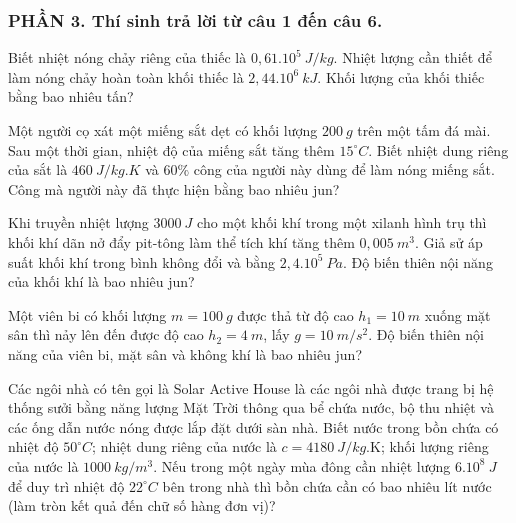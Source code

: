 \subsubsection*{PHẦN 3. Thí sinh trả lời từ câu 1 đến câu 6.}
\setcounter{ex}{0}
\begin{ex}
Biết nhiệt nóng chảy riêng của thiếc là $0,61.10^5\ J/kg$. Nhiệt lượng cần thiết để làm nóng chảy hoàn toàn khối thiếc là $2,44.10^6\ kJ$. Khối lượng của khối thiếc bằng bao nhiêu tấn?
\end{ex}
\begin{ex}
Một người cọ xát một miếng sắt dẹt có khối lượng $200\ g$ trên một tấm đá mài. Sau một thời gian, nhiệt độ của miếng sắt tăng thêm $15^{\circ}C$. Biết nhiệt dung riêng của sắt là $460\ J/kg.K$ và $60\%$ công của người này dùng để làm nóng miếng sắt. Công mà người này đã thực hiện bằng bao nhiêu jun?
\end{ex}
\begin{ex}
Khi truyền nhiệt lượng $3000\ J$ cho một khối khí trong một xilanh hình trụ thì khối khí dãn nở đẩy pit-tông làm thể tích khí tăng thêm $0,005\ m^3$. Giả sử áp suất khối khí trong bình không đổi và bằng $2,4.10^5\ Pa$. Độ biến thiên nội năng của khối khí là bao nhiêu jun?
\end{ex}
\begin{ex}
Một viên bi có khối lượng $m=100 \ g$ được thả từ độ cao $h_1=10 \ m$ xuống mặt sân thì nảy lên đến được độ cao $h_2=4 \ m$, lấy $g=10 \ m/s^2$. Độ biến thiên nội năng của viên bi, mặt sân và không khí là bao nhiêu jun?
\end{ex}
\begin{ex}
Các ngôi nhà có tên gọi là Solar Active House là các ngôi nhà được trang bị hệ thống sưởi bằng năng lượng Mặt Trời thông qua bể chứa nước, bộ thu nhiệt và các ống dẫn nước nóng được lắp đặt dưới sàn nhà. Biết nước trong bồn chứa có nhiệt độ $50^\circ C$; nhiệt dung riêng của nước là $c=4180 \ J/kg$.K; khối lượng riêng của nước là $1000 \ kg / m^3$. Nếu trong một ngày mùa đông cần nhiệt lượng $6.10^{8} \ J$ để duy trì nhiệt độ $22^\circ C$ bên trong nhà thì bồn chứa cần có bao nhiêu lít nước (làm tròn kết quả  đến chữ số hàng đơn vị)?
\end{ex}
